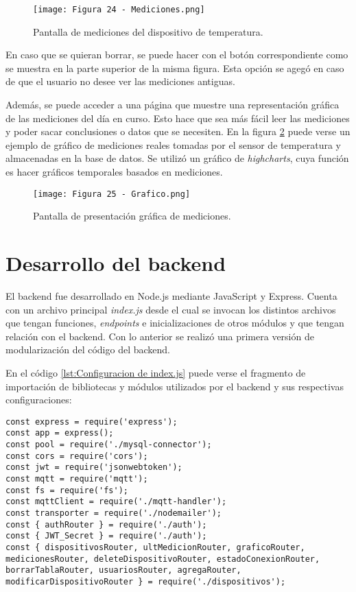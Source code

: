 \begin{figure}[h]
\centering
\texttt{[image: Figura 24 - Mediciones.png]}
\caption[Pantalla de mediciones del dispositivo de temperatura]{Pantalla de mediciones del dispositivo de temperatura.}
\label{fig:24}
\end{figure}

En caso que se quieran borrar, se puede hacer con el botón correspondiente como se muestra en la parte superior de la misma figura. Esta opción se agegó en caso de que el usuario no desee ver las mediciones antiguas.

Además, se puede acceder a una página que muestre una representación gráfica de las mediciones del día en curso. Esto hace que sea más fácil leer las mediciones y poder sacar conclusiones o datos que se necesiten. En la figura \ref{fig:25} puede verse un ejemplo de gráfico de mediciones reales tomadas por el sensor de temperatura y almacenadas en la base de datos. Se utilizó un gráfico de \textit{highcharts}, cuya función es hacer gráficos temporales basados en mediciones.

\begin{figure}[h]
\centering
\texttt{[image: Figura 25 - Grafico.png]}
\caption[Pantalla de presentación gráfica de mediciones]{Pantalla de presentación gráfica de mediciones.}
\label{fig:25}
\end{figure}

\section{Desarrollo del backend}

El backend fue desarrollado en Node.js mediante JavaScript y Express. Cuenta con un archivo principal \textit{index.js} desde el cual se invocan los distintos archivos que tengan funciones, \textit{endpoints} e inicializaciones de otros módulos y que tengan relación con el backend. Con lo anterior se realizó una primera versión de modularización del código del backend.

En el código \ref{lst:Configuracion de index.js} puede verse el fragmento de importación de bibliotecas y módulos utilizados por el backend y sus respectivas configuraciones:

\begin{lstlisting}[caption={Configuración de \textit{index.js}.}, label={lst:Configuracion de index.js}]
const express = require('express');
const app = express();
const pool = require('./mysql-connector');
const cors = require('cors');
const jwt = require('jsonwebtoken');
const mqtt = require('mqtt');
const fs = require('fs');
const mqttClient = require('./mqtt-handler');
const transporter = require('./nodemailer');
const { authRouter } = require('./auth');
const { JWT_Secret } = require('./auth');
const { dispositivosRouter, ultMedicionRouter, graficoRouter, medicionesRouter, deleteDispositivoRouter, estadoConexionRouter, borrarTablaRouter, usuariosRouter, agregaRouter, modificarDispositivoRouter } = require('./dispositivos');
\end{lstlisting}

